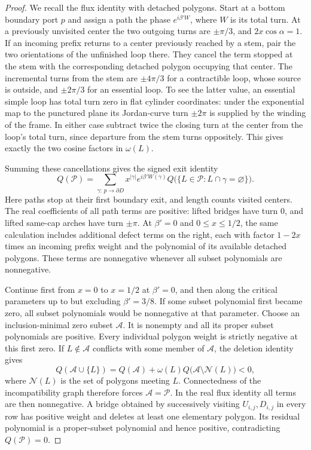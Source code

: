 \begin{proof}
We recall the flux identity with detached polygons. Start at a bottom boundary port $p$ and assign a path the phase $e^{i\beta' W}$, where $W$ is its total turn. At a previously unvisited center the two outgoing turns are $\pm\pi/3$, and $2x\cos\alpha=1$. If an incoming prefix returns to a center previously reached by a stem, pair the two orientations of the unfinished loop there. They cancel the term stopped at the stem with the corresponding detached polygon occupying that center. The incremental turns from the stem are $\pm4\pi/3$ for a contractible loop, whose source is outside, and $\pm2\pi/3$ for an essential loop. To see the latter value, an essential simple loop has total turn zero in flat cylinder coordinates: under the exponential map to the punctured plane its Jordan-curve turn $\pm2\pi$ is supplied by the winding of the frame. In either case subtract twice the closing turn at the center from the loop's total turn, since departure from the stem turns oppositely. This gives exactly the two cosine factors in $\omega(L)$.

Summing these cancellations gives the signed exit identity
\[
 Q(\mathcal P)=\sum_{\gamma:\,p\to\partial D}
 x^{|\gamma|}e^{i\beta'W(\gamma)}
 Q\bigl(\{L\in\mathcal P:L\cap\gamma=\varnothing\}\bigr).
\]
Here paths stop at their first boundary exit, and length counts visited centers. The real coefficients of all path terms are positive: lifted bridges have turn $0$, and lifted same-cap arches have turn $\pm\pi$. At $\beta'=0$ and $0\le x\le1/2$, the same calculation includes additional defect terms on the right, each with factor $1-2x$ times an incoming prefix weight and the polynomial of its available detached polygons. These terms are nonnegative whenever all subset polynomials are nonnegative.

Continue first from $x=0$ to $x=1/2$ at $\beta'=0$, and then along the critical parameters up to but excluding $\beta'=3/8$. If some subset polynomial first became zero, all subset polynomials would be nonnegative at that parameter. Choose an inclusion-minimal zero subset $\mathcal A$. It is nonempty and all its proper subset polynomials are positive. Every individual polygon weight is strictly negative at this first zero. If $L\notin\mathcal A$ conflicts with some member of $\mathcal A$, the deletion identity gives
\[
 Q(\mathcal A\cup\{L\})
 =Q(\mathcal A)+\omega(L)Q\bigl(\mathcal A\setminus\mathcal N(L)\bigr)<0,
\]
where $\mathcal N(L)$ is the set of polygons meeting $L$. Connectedness of the incompatibility graph therefore forces $\mathcal A=\mathcal P$. In the real flux identity all terms are then nonnegative. A bridge obtained by successively visiting $U_{i,j},D_{i,j}$ in every row has positive weight and deletes at least one elementary polygon. Its residual polynomial is a proper-subset polynomial and hence positive, contradicting $Q(\mathcal P)=0$.


\end{proof}
